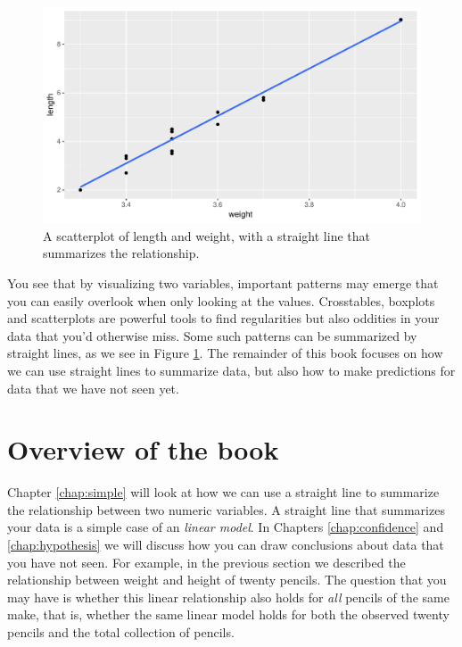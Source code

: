 \documentclass[]{book}\usepackage[]{graphicx}\usepackage[]{color}
\makeatletter
\def\maxwidth{ %
  \ifdim\Gin@nat@width>\linewidth
    \linewidth
  \else
    \Gin@nat@width
  \fi
}
\makeatother
\begin{document}
\begin{figure}

{\centering \includegraphics[width=\maxwidth]{figure/line_1-1} 

}

\caption[A scatterplot of length and weight, with a straight line that summarizes the relationship]{A scatterplot of length and weight, with a straight line that summarizes the relationship.}\label{fig:line_1}
\end{figure}



You see that by visualizing two variables, important patterns may emerge that you can easily overlook when only looking at the values. Crosstables, boxplots and scatterplots are powerful tools to find regularities but also oddities in your data that you'd otherwise miss. Some such patterns can be summarized by straight lines, as we see in Figure \ref{fig:line_1}. The remainder of this book focuses on how we can use straight lines to summarize data, but also how to make predictions for data that we have not seen yet.


\section{Overview of the book}

Chapter \ref{chap:simple} will look at how we can use a straight line to summarize the relationship between two numeric variables. A straight line that summarizes your data is a simple case of an \textit{linear model}. In Chapters \ref{chap:confidence} and \ref{chap:hypothesis} we will discuss how you can draw conclusions about data that you have not seen. For example, in the previous section we described the relationship between weight and height of twenty pencils. The question that you may have is whether this linear relationship also holds for \textit{all} pencils of the same make, that is, whether the same linear model holds for both the observed twenty pencils and the total collection of pencils.
\end{document}
